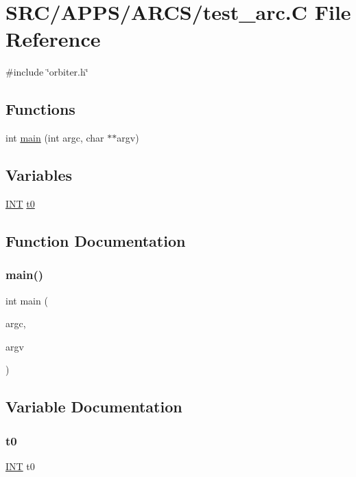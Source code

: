 \hypertarget{test__arc_8_c}{}\section{S\+R\+C/\+A\+P\+P\+S/\+A\+R\+C\+S/test\+\_\+arc.C File Reference}
\label{test__arc_8_c}
{\ttfamily \#include \char`\"{}orbiter.\+h\char`\"{}}\newline
\subsection*{Functions}
\begin{DoxyCompactItemize}
\item 
int \mbox{\hyperlink{test__arc_8_c_a3c04138a5bfe5d72780bb7e82a18e627}{main}} (int argc, char $\ast$$\ast$argv)
\end{DoxyCompactItemize}
\subsection*{Variables}
\begin{DoxyCompactItemize}
\item 
\mbox{\hyperlink{galois_8h_a09fddde158a3a20bd2dcadb609de11dc}{I\+NT}} \mbox{\hyperlink{test__arc_8_c_a4268f4fe222ffb119218a0199f5e1904}{t0}}
\end{DoxyCompactItemize}


\subsection{Function Documentation}
\mbox{\label{test__arc_8_c_a3c04138a5bfe5d72780bb7e82a18e627}} 
\subsubsection{\texorpdfstring{main()}{main()}}
{\footnotesize\ttfamily int main (\begin{DoxyParamCaption}\item[{int}]{argc,  }\item[{char $\ast$$\ast$}]{argv }\end{DoxyParamCaption})}



\subsection{Variable Documentation}
\mbox{\label{test__arc_8_c_a4268f4fe222ffb119218a0199f5e1904}} 
\subsubsection{\texorpdfstring{t0}{t0}}
{\footnotesize\ttfamily \mbox{\hyperlink{galois_8h_a09fddde158a3a20bd2dcadb609de11dc}{I\+NT}} t0}

